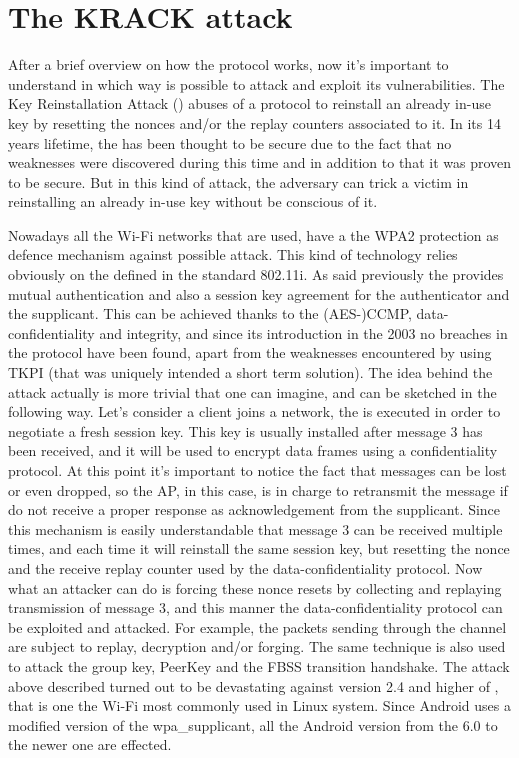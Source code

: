\section{The KRACK attack}

After a brief overview on how the \fwh protocol works, now it's important to understand in which way is possible to attack and exploit its vulnerabilities.
The Key Reinstallation Attack (\krack) abuses of a protocol to reinstall an already in-use key 
by resetting the nonces and/or the replay counters associated to it. In its 14 years lifetime, the \fwh has been thought to be secure due to the fact that no weaknesses were discovered during this time and in addition to that it was proven to be secure.
But in this kind of attack, the adversary can trick a victim in reinstalling an already in-use key without be conscious of it.

Nowadays all the Wi-Fi networks that are used, have a the WPA2 protection as defence mechanism against possible attack. This kind of technology relies obviously on the \fwh defined in the standard 802.11i.
As said previously the \fwh provides mutual authentication and also a session key agreement for the authenticator and the supplicant. This can be achieved thanks to the (AES-)CCMP, data-confidentiality and integrity, and since its introduction 
in the 2003 no breaches in the protocol have been found, apart from the weaknesses encountered by using TKPI (that was uniquely intended a short term solution).
The idea behind the attack actually is more trivial that one can imagine, and can be sketched in the following way. Let's consider a client joins a network, the \fwh is executed in order to negotiate a fresh session key. This key is usually installed after message 3 has been received, and it will be used
to encrypt data frames using a confidentiality protocol. At this point it's important to notice the fact that messages can be lost or even dropped, so the AP, in this case, is in charge to retransmit the message if do not receive a proper response as acknowledgement from the supplicant. Since this mechanism is easily 
understandable that message 3 can be received multiple times, and each time it will reinstall the same session key, but resetting the nonce and the receive replay counter used by the data-confidentiality protocol.
Now what an attacker can do is forcing these nonce resets by collecting and replaying transmission of message 3, and this manner the data-confidentiality protocol can be exploited and attacked. For example, the packets sending through the channel are subject to replay, decryption and/or forging.
The same technique is also used to attack the group key, PeerKey and the FBSS transition handshake.
The attack above described turned out to be devastating against version 2.4 and higher of , that is one the Wi-Fi most commonly used in Linux system. Since Android uses a modified version of the wpa\_supplicant, all the Android version from the 6.0 to the newer one are effected.

